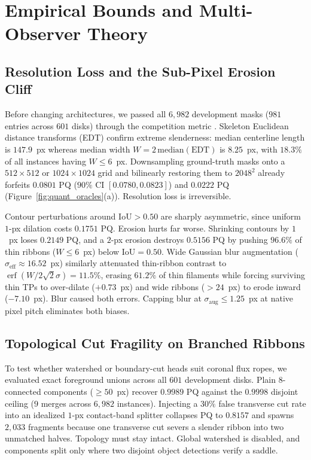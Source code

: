 \documentclass[sigconf]{acmart}
\begin{document}
\section{Empirical Bounds and Multi-Observer Theory}\label{sec:oracles}

\subsection{Resolution Loss and the Sub-Pixel Erosion Cliff}
    Before changing architectures, we passed all $6{,}982$ development masks ($981$ entries across $601$ disks) through the competition metric \cite{kirillov2019panoptic}. Skeleton Euclidean distance transforms (EDT) confirm extreme slenderness: median centerline length is $147.9$~px whereas median width $W = 2\,\text{median}(\text{EDT})$ is $8.25$~px, with $18.3\%$ of all instances having $W \le 6$~px. Downsampling ground-truth masks onto a $512 \times 512$ or $1024 \times 1024$ grid and bilinearly restoring them to $2048^2$ already forfeits $0.0801$ PQ ($90\%$ CI $[0.0780, 0.0823]$) and $0.0222$ PQ (Figure~\ref{fig:quant_oracles}(a)). Resolution loss is irreversible.

    Contour perturbations around $\text{IoU} > 0.50$ are sharply asymmetric, since uniform $1$-px dilation costs $0.1751$ PQ. Erosion hurts far worse. Shrinking contours by $1$~px loses $0.2149$ PQ, and a $2$-px erosion destroys $0.5156$ PQ by pushing $96.6\%$ of thin ribbons ($W \le 6$~px) below $\text{IoU} = 0.50$. Wide Gaussian blur augmentation ($\sigma_{\text{eff}} \approx 16.52$~px) similarly attenuated thin-ribbon contrast to $\operatorname{erf}(W / 2\sqrt{2}\sigma) = 11.5\%$, erasing $61.2\%$ of thin filaments while forcing surviving thin TPs to over-dilate ($+0.73$~px) and wide ribbons ($>24$~px) to erode inward ($-7.10$~px). Blur caused both errors. Capping blur at $\sigma_{\text{aug}} \le 1.25$~px at native pixel pitch eliminates both biases.

\subsection{Topological Cut Fragility on Branched Ribbons}
    To test whether watershed or boundary-cut heads suit coronal flux ropes, we evaluated exact foreground unions across all $601$ development disks. Plain $8$-connected components ($\ge 50$~px) recover $0.9989$ PQ against the $0.9998$ disjoint ceiling ($9$ merges across $6{,}982$ instances). Injecting a $30\%$ false transverse cut rate into an idealized $1$-px contact-band splitter collapses PQ to $0.8157$ and spawns $2{,}033$ fragments because one transverse cut severs a slender ribbon into two unmatched halves. Topology must stay intact. Global watershed is disabled, and components split only where two disjoint object detections verify a saddle.
\end{document}
